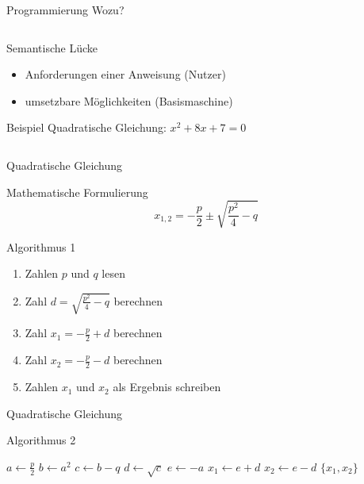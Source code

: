 \begin{frame}[shrink]{Programmierung Wozu?}
\begin{columns}[t]
\begin{column}{0.5\textwidth}
\begin{block}{Semantische Lücke}
\begin{itemize}
\begin{itemize}
                    \item Anforderungen einer Anweisung (Nutzer)
                    \item umsetzbare Möglichkeiten (Basismaschine)
                    \end{itemize}
                \end{itemize}
            \end{block}
            \begin{block}{Beispiel}
                Quadratische Gleichung: $x^2 + 8x + 7 = 0$
            \end{block}
        \end{column}
    \end{columns}
\end{frame}

\begin{frame}{Quadratische Gleichung}
    \begin{block}{Mathematische Formulierung}
        \[x_{1,2} = -\frac{p}{2}\pm\sqrt{\frac{p^2}{4}-q}\]
    \end{block}
    \begin{block}{Algorithmus 1}
        \begin{enumerate}
        \item Zahlen $p$ und $q$ lesen
        \item Zahl $d = \sqrt{\frac{p^2}{4}-q}$ berechnen
        \item Zahl $x_1 = -\frac{p}{2} + d$ berechnen
        \item Zahl $x_2 = -\frac{p}{2} - d$ berechnen
        \item Zahlen $x_1$ und $x_2$ als Ergebnis schreiben
        \end{enumerate}
    \end{block}
\end{frame}

\begin{frame}[shrink]{Quadratische Gleichung}
    \begin{block}{Algorithmus 2}
        \begin{algorithm}[H]
        \label{alg:2}
        \begin{algorithmic}
                \State $a\gets \frac{p}{2}$
                \State $b\gets a^2$
                \State $c\gets b - q$
                \State $d\gets \sqrt{c}$
                \State $e\gets -a$
                \State $x_{1}\gets e+d$
                \State $x_{2}\gets e-d$
                \State \Return $\{ x_{1}, x_{2}\}$
            \EndFunction
        \end{algorithmic}
        \end{algorithm}
    \end{block}
\end{frame}

